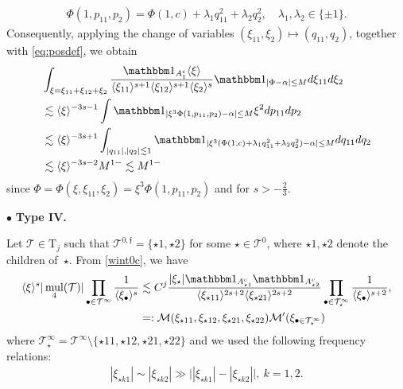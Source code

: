 \documentclass[%
11pt,  reqno]{amsart}
\newcommand{\5}{\textup{V}}
\newcommand{\noi}{\noindent}
\newcommand{\ind}{\mathbbm 1}
\newcommand{\les}{\lesssim}
\newcommand{\wt}{\widetilde}
\theoremstyle{remark}
\newcommand{\bul}{\bullet}
\newcommand{\TT}{\mathcal{T}}
\newcommand{\Tr}{\mathrm{T}}
\newcommand{\al}{\alpha}
\newcommand{\jb}[1]
{\langle #1 \rangle}
\newcommand{\ff}{\mathfrak{f}}
\newcommand{\M}{\mathcal{M}}
\DeclareMathOperator{\mul}{mul}
\numberwithin{equation}{section}
\numberwithin{theorem}{section}
\begin{document}
\begin{align}
\Phi(1, p_{11},p_2) = \Phi(1, c) + \lambda_1q_{11}^2 + \lambda_2q_2^2, \quad \lambda_1,\lambda_2\in\{\pm1\}.
\end{align}
Consequently, applying the change of variables $(\xi_{11},\xi_2) \mapsto (q_{11}, q_2)$, together with \eqref{eq:posdef}, we obtain
\begin{align}
&
\int_{\xi = \xi_{11} + \xi_{12} + \xi_2} \frac{\ind_{A_1^c}  \jb{\xi}}{ \jb{\xi_{11}}^{s+1} \jb{\xi_{12}}^{s+1} \jb{\xi_2}^s}
\ind_{|\Phi - \al| \le M}
d\xi_{11} d\xi_2
\\
&
\les 
\jb{\xi}^{ - 3 s - 1   } \int \ind_{|\xi^3 \Phi(1, p_{11}, p_2) - \al| \le M} \xi^2 dp_{11} dp_2
\\
&
\les 
\jb{\xi}^{- 3s + 1  } \int_{|q_{11}|, |q_2| \les 1} \ind_{| \xi^3( \Phi(1,c) + \lambda_1q_{11}^2 +  \lambda_2q_2^2 )- \al | \le M  } dq_{11} d q_2
\\
&
\les 
\jb{\xi}^{- 3s -2   } M^{1-} \les M^{1-}
\end{align}
since $\Phi = \Phi(\xi, \xi_{11},\xi_2) = \xi^3 \Phi(1, p_{11}, p_2)$ and for $s>-\frac23$. 


\smallskip 



\noi
$\bul$ \textbf{Type IV.}

Let $\TT\in\Tr_j$ such that $\TT^{0,\ff} = \{\star1,\star2\}$ for some $\star\in \TT^0$, where $\star1,\star2$ denote the children of~$\star$. 
From \eqref{wint0c}, we have
\begin{align}\label{L24}
\jb{\xi}^s  |\mul_4(\TT)| 
\prod_{\bul \in \TT^\infty} \frac{1}{\jb{\xi_\bul}^s}
&\les 
C^{j}
\frac{|\xi_\star| \ind_{A^c_{\star1}} \ind_{A^c_{\star2}} }{ 
\jb{\xi_{\star11}}^{2s+2} \jb{\xi_{\star21}}^{2s+2}  } \prod_{\bul\in \TT^\infty_\star} \frac{1}{\jb{\xi_\bul}^{s+2}}, \\ &=: \mathcal{M}(\xi_{\star11}, \xi_{\star12}, \xi_{\star21}, \xi_{\star22})\M'(\xi_{\bul\in\TT^\infty_\star})
\end{align}
where $\TT^\infty_\star = \TT^\infty \setminus\{ \star11, \star12, \star21, \star22\}$ and we used the following frequency relations:
\begin{align}\label{L24freq}
|\xi_{\star k 1 } | \sim |\xi_{\star k2 } | \gg \big| |\xi_{\star k 1} | - |\xi_{\star k 2 }| \big|, \ k=1,2. 
\end{align}
\end{document}
